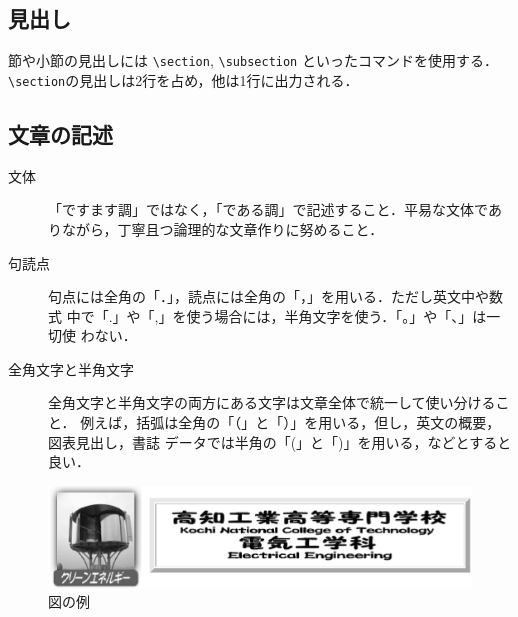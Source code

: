 \documentclass{jsarticle}
\begin{document}
\subsection{見出し}

節や小節の見出しには \verb|\section|, \verb|\subsection| といったコマンドを使用する．
\verb|\section|の見出しは2行を占め，他は1行に出力される．

\subsection{文章の記述}

\begin{description}
\item[文体]
「ですます調」ではなく，「である調」で記述すること．平易な文体でありながら，丁寧且つ論理的な文章作りに努めること．

\item[句読点]
句点には全角の「．」，読点には全角の「，」を用いる．ただし英文中や数式
中で「.」や「,」を使う場合には，半角文字を使う．「。」や「、」は一切使
わない．

\item[全角文字と半角文字]
全角文字と半角文字の両方にある文字は文章全体で統一して使い分けること．
例えば，括弧は全角の「（」と「）」を用いる，但し，英文の概要，図表見出し，書誌
データでは半角の「(」と「)」を用いる，などとすると良い．
\end{description}



\begin{figure}[tb]
  \begin{center}
    \includegraphics[keepaspectratio=true,height=.20\hsize]{KNCT-EE.eps}
  \end{center}
  \caption{図の例}%
  \label{KNCT-EE}
\end{figure}
\end{document}
